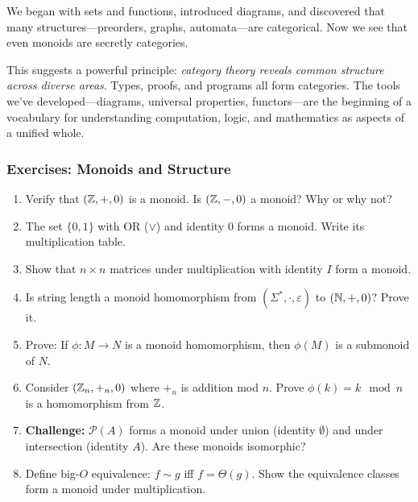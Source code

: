 \begin{goingdeeper}
We began with sets and functions, introduced diagrams, and discovered that many structures---preorders, graphs, automata---are categorical. Now we see that even monoids are secretly categories.

This suggests a powerful principle: \emph{category theory reveals common structure across diverse areas}. Types, proofs, and programs all form categories. The tools we've developed---diagrams, universal properties, functors---are the beginning of a vocabulary for understanding computation, logic, and mathematics as aspects of a unified whole.

\subsubsection*{Exercises: Monoids and Structure}

\begin{enumerate}
  \item Verify that $(\mathbb{Z}, +, 0)$ is a monoid. Is $(\mathbb{Z}, -, 0)$ a monoid? Why or why not?

  \item The set $\{0, 1\}$ with OR ($\lor$) and identity 0 forms a monoid. Write its multiplication table.

  \item Show that $n \times n$ matrices under multiplication with identity $I$ form a monoid.

  \item Is string length a monoid homomorphism from $(\Sigma^*, \cdot, \varepsilon)$ to $(\mathbb{N}, +, 0)$? Prove it.

  \item Prove: If $\phi: M \to N$ is a monoid homomorphism, then $\phi(M)$ is a submonoid of $N$.

  \item Consider $(\mathbb{Z}_n, +_n, 0)$ where $+_n$ is addition mod $n$. Prove $\phi(k) = k \mod n$ is a homomorphism from $\mathbb{Z}$.

  \item \textbf{Challenge:} $\mathcal{P}(A)$ forms a monoid under union (identity $\emptyset$) and under intersection (identity $A$). Are these monoids isomorphic?

  \item Define big-$O$ equivalence: $f \sim g$ iff $f = \Theta(g)$. Show the equivalence classes form a monoid under multiplication.
\end{enumerate}
\end{goingdeeper}

